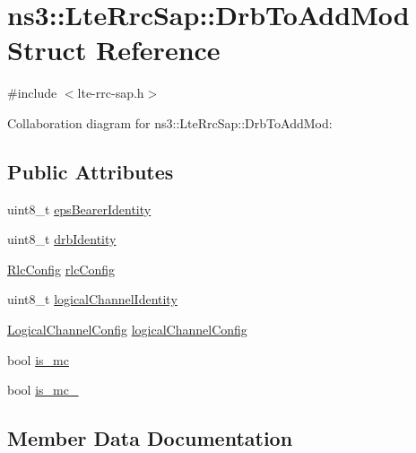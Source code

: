 \hypertarget{structns3_1_1LteRrcSap_1_1DrbToAddMod}{}\section{ns3\+:\+:Lte\+Rrc\+Sap\+:\+:Drb\+To\+Add\+Mod Struct Reference}
\label{structns3_1_1LteRrcSap_1_1DrbToAddMod}


{\ttfamily \#include $<$lte-\/rrc-\/sap.\+h$>$}



Collaboration diagram for ns3\+:\+:Lte\+Rrc\+Sap\+:\+:Drb\+To\+Add\+Mod\+:
\subsection*{Public Attributes}
\begin{DoxyCompactItemize}
\item 
uint8\+\_\+t \hyperlink{structns3_1_1LteRrcSap_1_1DrbToAddMod_a156fd260b20b3fdffc127bb212f43a43}{eps\+Bearer\+Identity}
\item 
uint8\+\_\+t \hyperlink{structns3_1_1LteRrcSap_1_1DrbToAddMod_ae3a103ccc8b210151f8b497b344f6b92}{drb\+Identity}
\item 
\hyperlink{structns3_1_1LteRrcSap_1_1RlcConfig}{Rlc\+Config} \hyperlink{structns3_1_1LteRrcSap_1_1DrbToAddMod_a67f31637f94f2ce0dbf5d139be73f78e}{rlc\+Config}
\item 
uint8\+\_\+t \hyperlink{structns3_1_1LteRrcSap_1_1DrbToAddMod_ad23dad5b21e1b89f3d42f1dbd61cfa75}{logical\+Channel\+Identity}
\item 
\hyperlink{structns3_1_1LteRrcSap_1_1LogicalChannelConfig}{Logical\+Channel\+Config} \hyperlink{structns3_1_1LteRrcSap_1_1DrbToAddMod_af761fbd6ee6404f841b5715e09ecca3b}{logical\+Channel\+Config}
\item 
bool \hyperlink{structns3_1_1LteRrcSap_1_1DrbToAddMod_ad296bfab86b427f83a5c5e0163639523}{is\+\_\+mc}
\item 
bool \hyperlink{structns3_1_1LteRrcSap_1_1DrbToAddMod_aa28131da8e8f3107e3d79f8518f0b520}{is\+\_\+mc\+\_}
\end{DoxyCompactItemize}


\subsection{Member Data Documentation}
